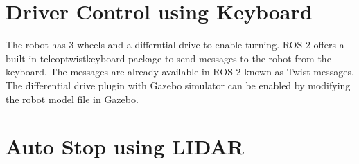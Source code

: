 \documentclass[%
xelatex,
	oneside,		%
	12pt,			%
	parskip=half,	%
	abstracton,
	chapterprefix=true%
    appendixprefix=true]
{scrbook}
\begin{document}
				\section{Driver Control using Keyboard}	
	\vspace*{0.5cm}
The robot has 3 wheels and a differntial drive to enable turning. ROS 2 offers a built-in teleop\textunderscore twist\textunderscore keyboard package to send messages to the robot from the keyboard. The messages are already available in ROS 2 known as Twist messages. The differential drive plugin with Gazebo simulator can be enabled by modifying the robot model file in Gazebo. 	

		\section{Auto Stop using LIDAR}
		\vspace*{0.5cm}
		
\end{document}
